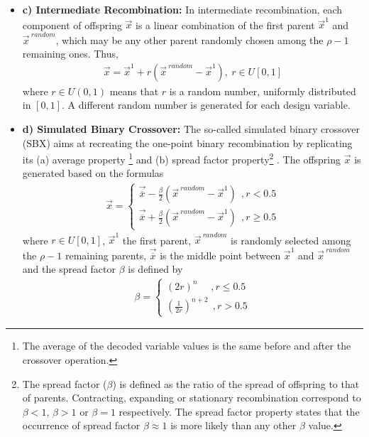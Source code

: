 \begin{itemize}
\FloatBarrier    
\item[]{\bf c) Intermediate Recombination:}  In intermediate recombination, each component of  offspring $\vec{x}$ is a linear combination of the first parent $\vec{x}^1$ and $\vec{x}^{~random}$, which may be any other parent randomly chosen among the $\rho-1$ remaining ones. Thus,
\begin{eqnarray}
\nonumber
\vec{x}=\vec{x}^1+r(\vec{x}^{~random}-\vec{x}^1),~ r\in U[0,1]
\end{eqnarray}  
where $r \in U(0,1)$ means that $r$ is a random number, uniformly distributed in $[0,1]$. A different random number is generated for each design variable.

\FloatBarrier 
\item[]{\bf d) Simulated Binary Crossover:} The so-called simulated binary crossover (SBX) \cite{SBX1} aims at recreating the one-point binary recombination by replicating its (a) average property \footnote{The average of the decoded variable values is the same
before and after the crossover operation.} and (b) spread factor property\footnote{The spread factor ($\beta$) is defined as the ratio of the spread of offspring to that of parents. Contracting, expanding or stationary recombination correspond to $\beta \! <\!1$, $\beta\! >\!1$ or $\beta \!=\!1$ respectively. The spread factor property states that the occurrence of spread factor $\beta \! \approx \! 1$ is more likely than any other $\beta$ value. } \cite{SBX1}. The offspring $\vec{x}$ is generated based on the formulas
\begin{eqnarray}
	\vec{x}={\left\{ 
	\begin{array}{ll}
    \vec{\overline{x}} - \frac{\beta}{2} (\vec{x}^{~random}-\vec{x}^1)~~,\mbox{$r < 0.5$}\\
	\vec{\overline{x}} + \frac{\beta}{2} (\vec{x}^{~random}-\vec{x}^1)~~,\mbox{$r \geq 0.5$}
    \end{array} \right. }
    \label{sbxx}
\end{eqnarray}  
where $r\in U[0,1]$, $\vec{x}^1$ the first parent, $\vec{x}^{~random}$ is randomly selected among the $\rho-1$ remaining parents, $\vec{\overline{x}}$ is the middle point between $\vec{x}^{1}$ and $\vec{x}^{~random}$ and the spread factor $\beta$ is defined by
\begin{eqnarray}
	\beta={\left\{ 
	\begin{array}{ll}
    (2r)^{n}~~~~~~,\mbox{$r \leq 0.5$}\\
	\left(\frac{1}{2r}\right)^{n+2}~~,\mbox{$r > 0.5$}
    \end{array} \right. }
    \label{betasbx}
\end{eqnarray}


\end{itemize}
